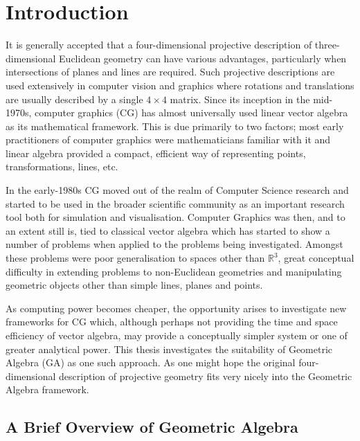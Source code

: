 \begin{savequote}
\end{savequote}

\chapter{Introduction}
\label{chap:introduction}

It is generally accepted that a four-dimensional projective description of
three-dimensional Euclidean geometry can have various advantages, particularly
when intersections of planes and lines are required. Such projective
descriptions are used extensively in computer vision and graphics where
rotations and translations are usually described by a single $4\times 4$
matrix. Since its inception in the mid-1970s, computer graphics (CG) has
almost universally used linear vector algebra as its mathematical framework.
This is due primarily to two factors; most early practitioners of computer
graphics were mathematicians familiar with it and linear algebra provided a
compact, efficient way of representing points, transformations, lines, etc.

In the early-1980s CG moved out of the realm of Computer Science research and
started to be used in the broader scientific community as an important
research tool both for simulation and visualisation.  Computer Graphics was
then, and to an extent still is, tied to classical vector algebra which has
started to show a number of problems when applied to the problems being
investigated. Amongst these problems were poor generalisation to spaces other
than $\mathbb{R}^3$, great conceptual difficulty in extending problems to
non-Euclidean geometries and manipulating geometric objects other than simple
lines, planes and points.

As computing power becomes cheaper, the opportunity arises to investigate new
frameworks for CG which, although perhaps not providing the time and space
efficiency of vector algebra, may provide a conceptually simpler system or one
of greater analytical power. This thesis investigates the suitability of
Geometric Algebra (GA) as one such approach. As one might hope the original
four-dimensional description of projective geometry fits very nicely into the
Geometric Algebra framework\cite{Hx91,IJPR00}. 

\section{A Brief Overview of Geometric Algebra}

